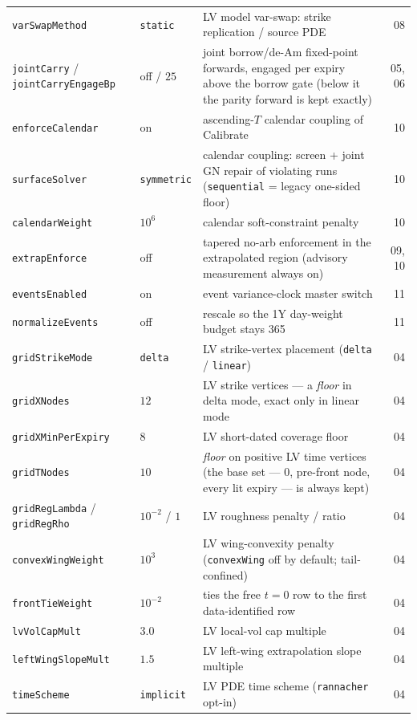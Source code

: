 \documentclass[11pt]{article}
\begin{document}
\begin{longtable}{p{}p{}p{}r}
\texttt{varSwapMethod} & \texttt{static} & LV model var-swap: strike replication /
source PDE & 08\\
\texttt{jointCarry} / \texttt{jointCarryEngageBp} & off / $25$ & joint
borrow/de-Am fixed-point forwards, engaged per expiry above the borrow gate
(below it the parity forward is kept exactly) & 05, 06\\
\texttt{enforceCalendar} & on & ascending-$T$ calendar coupling of Calibrate & 10\\
\texttt{surfaceSolver} & \texttt{symmetric} & calendar coupling: screen +
joint GN repair of violating runs (\texttt{sequential} = legacy one-sided
floor) & 10\\
\texttt{calendarWeight} & $10^{6}$ & calendar soft-constraint penalty & 10\\
\texttt{extrapEnforce} & off & tapered no-arb enforcement in the extrapolated
region (advisory measurement always on) & 09, 10\\
\texttt{eventsEnabled} & on & event variance-clock master switch & 11\\
\texttt{normalizeEvents} & off & rescale so the 1Y day-weight budget stays 365 & 11\\
\texttt{gridStrikeMode} & \texttt{delta} & LV strike-vertex placement
(\texttt{delta} / \texttt{linear}) & 04\\
\texttt{gridXNodes} & $12$ & LV strike vertices --- a \emph{floor} in delta
mode, exact only in linear mode & 04\\
\texttt{gridXMinPerExpiry} & $8$ & LV short-dated coverage floor & 04\\
\texttt{gridTNodes} & $10$ & \emph{floor} on positive LV time vertices (the
base set --- $0$, pre-front node, every lit expiry --- is always kept) & 04\\
\texttt{gridRegLambda} / \texttt{gridRegRho} & $10^{-2}$ / $1$ & LV roughness penalty / ratio & 04\\
\texttt{convexWingWeight} & $10^{3}$ & LV wing-convexity penalty
(\texttt{convexWing} off by default; tail-confined) & 04\\
\texttt{frontTieWeight} & $10^{-2}$ & ties the free $t=0$ row to the first
data-identified row & 04\\
\texttt{lvVolCapMult} & $3.0$ & LV local-vol cap multiple & 04\\
\texttt{leftWingSlopeMult} & $1.5$ & LV left-wing extrapolation slope multiple & 04\\
\texttt{timeScheme} & \texttt{implicit} & LV PDE time scheme
(\texttt{rannacher} opt-in) & 04\\

\end{longtable}
\end{document}
